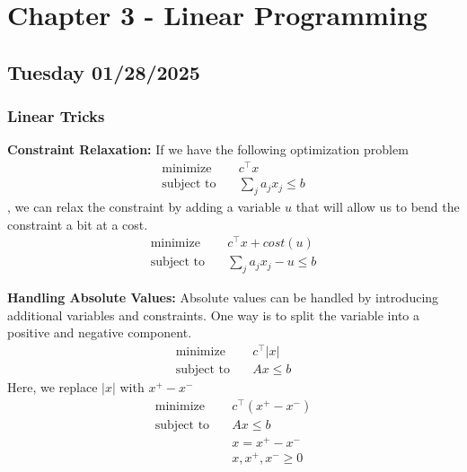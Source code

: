 \section{Chapter 3 - Linear Programming}
\usetikzlibrary{arrows,automata}
\subsection{Tuesday 01/28/2025}
\subsubsection{Linear Tricks}
\textbf{Constraint Relaxation: }
If we have the following optimization problem
\begin{align}
  \text{minimize} & \quad c^\top x \\
  \text{subject to} & \quad \sum_j a_j x_j \leq  b
\end{align},
we can relax the constraint by adding a variable $u$ that will allow us to bend the constraint a bit at a cost.
\begin{align}
  \text{minimize} & \quad c^\top x + cost(u) \\
  \text{subject to} & \quad \sum_j a_j x_j - u \leq b
\end{align}

\textbf{Handling Absolute Values: }
Absolute values can be handled by introducing additional variables and constraints.
One way is to split the variable into a positive and negative component.
\begin{align}
  \text{minimize} & \quad c^\top |x| \\
  \text{subject to} & \quad Ax \leq b
\end{align}
Here, we replace $|x|$ with $x^+ - x^-$
\begin{align}
    \text{minimize} & \quad c^\top (x^+ - x^-) \\
    \text{subject to} & \quad Ax \leq b \\
    & \quad x = x^+ - x^- \\
    & \quad x, x^+, x^- \geq 0
\end{align}

